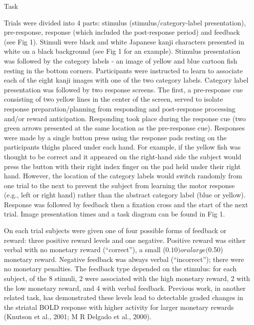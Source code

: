 Task  

Trials were divided into 4 parts: stimulus (stimulus/category-label presentation), pre-response, response (which included the post-response period) and feedback (see Fig 1). Stimuli were black and white Japanese kanji characters presented in white on a black background (see Fig 1 for an example).  Stimulus presentation was followed by the category labels - an image of yellow and blue cartoon fish resting in the bottom corners.  Participants were instructed to learn to associate each of the eight kanji images with one of the two category labels.  Category label presentation was followed by two response screens.  The first, a pre-response cue consisting of two yellow lines in the center of the screen, served to isolate response preparation/planning from responding and post-response processing and/or reward anticipation. Responding took place during the response cue (two green arrows presented at the same location as the pre-response cue).  Responses were made by a single button press using the response pads resting on the participants thighs placed under each hand.  For example, if the yellow fish was thought to be correct and it appeared on the right-hand side the subject would press the button with their right index finger on the pad held under their right hand. However, the location of the category labels would switch randomly from one trial to the next to prevent the subject from learning the motor response (e.g., left or right hand) rather than the abstract category label (blue or yellow).  Response was followed by feedback then a fixation cross and the start of the next trial.  Image presentation times and a task diagram can be found in Fig 1.

On each trial subjects were given one of four possible forms of feedback or reward: three positive reward levels and one negative.  Positive reward was either verbal with no monetary reward (“correct”), a small ($0.10) or a large ($0.50) monetary reward. Negative feedback was always verbal (“incorrect”); there were no monetary penalties. The feedback type depended on the stimulus:  for each subject, of the 8 stimuli, 2 were associated with the high monetary reward, 2 with the low monetary reward, and 4 with verbal feedback. Previous work, in another related task, has demonstrated these levels lead to detectable graded changes in the striatal BOLD response with higher activity for larger monetary rewards (Knutson et al., 2001; M R Delgado et al., 2000).

